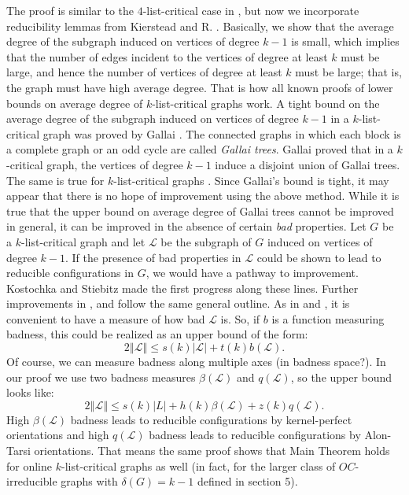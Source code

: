 \documentclass[10pt]{article}
\renewcommand{\le}{\leqslant}
\theoremstyle{plain}
\theoremstyle{definition}
\theoremstyle{remark}
\newcommand{\fancy}[1]{\mathcal{#1}}
\renewcommand{\L}{\fancy{L}}
\newcommand{\card}[1]{\left|#1\right|}
\newcommand{\size}[1]{\left\Vert#1\right\Vert}
\begin{document}
The proof is similar to the $4$-list-critical case in \cite{Better4ListCriticalBound}, but now we incorporate reducibility lemmas from Kierstead and R. \cite{OreVizing}.  
Basically, we show that the average degree of the subgraph induced on vertices of degree $k-1$ is small, which implies that the number of edges incident to the vertices of degree at least $k$ must be large,
and hence the number of vertices of degree at least $k$ must be large; that is, the graph must have high average degree.  That is how all known proofs of lower bounds on average degree of $k$-list-critical graphs work.
A tight bound on the average degree of the subgraph induced on vertices of degree $k-1$ in a $k$-list-critical graph was proved by Gallai \cite{gallai1963kritische}.  The connected graphs in which each block is a complete graph
or an odd cycle are called \emph{Gallai trees}.  Gallai \cite{gallai1963kritische} proved that in a $k$-critical graph, the vertices of degree $k-1$ induce a disjoint union of Gallai trees.  
The same is true for $k$-list-critical graphs \cite{borodin1977criterion, erdos1979choosability}.  Since Gallai's bound is tight, it may appear that there is no hope of improvement using the above method.  
While it is true that the upper bound on average degree of Gallai trees cannot be improved in general, it can be improved in the absence of certain \emph{bad} properties.  
Let $G$ be a $k$-list-critical graph and let $\L$ be the subgraph of $G$ induced on vertices of degree $k-1$.
If the presence of bad properties in $\L$ could be shown to lead to reducible configurations in $G$, we would have a pathway to improvement.  Kostochka and Stiebitz \cite{kostochkastiebitzedgesincriticalgraph}
made the first progress along these lines.  Further improvements in \cite{OreVizing}, \cite{DischargingLowerBound} and \cite{Better4ListCriticalBound} follow the same general outline.  
As in \cite{DischargingLowerBound} and \cite{Better4ListCriticalBound}, it is convenient to have a measure of how bad $\L$ is.  So, if $b$ is a function measuring badness, this could be realized as
an upper bound of the form:
\[2\size{\L} \le s(k)\card{\L} + t(k)b(\L).\]
Of course, we can measure badness along multiple axes (in badness space?).  In our proof we use two badness measures $\beta(\L)$ and $q(\L)$, so the upper bound looks like:
\[2\size{\L} \le s(k)\card{L} + h(k)\beta(\L) + z(k)q(\L).\]
High $\beta(\L)$ badness leads to reducible configurations by kernel-perfect orientations and high $q(\L)$ badness leads to reducible configurations by Alon-Tarsi orientations.
That means the same proof shows that Main Theorem holds for online $k$-list-critical graphs as well (in fact, for the larger class of $OC$-irreducible graphs with $\delta(G) = k-1$ defined in section 5).
\end{document}
